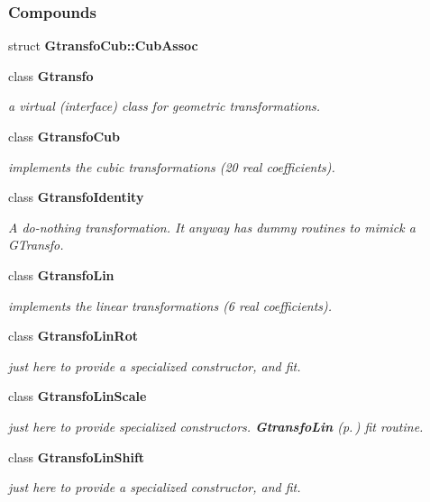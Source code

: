 \subsubsection*{Compounds}
\begin{CompactItemize}
\item 
struct {\bf Gtransfo\-Cub::Cub\-Assoc}
\item 
class {\bf Gtransfo}
\begin{CompactList}\small\item\em a virtual (interface) class for geometric transformations.\item\end{CompactList}\item 
class {\bf Gtransfo\-Cub}
\begin{CompactList}\small\item\em implements the cubic transformations (20 real coefficients).\item\end{CompactList}\item 
class {\bf Gtransfo\-Identity}
\begin{CompactList}\small\item\em A do-nothing transformation. It anyway has dummy routines to mimick a GTransfo.\item\end{CompactList}\item 
class {\bf Gtransfo\-Lin}
\begin{CompactList}\small\item\em implements the linear transformations (6 real coefficients).\item\end{CompactList}\item 
class {\bf Gtransfo\-Lin\-Rot}
\begin{CompactList}\small\item\em just here to provide a specialized constructor, and fit.\item\end{CompactList}\item 
class {\bf Gtransfo\-Lin\-Scale}
\begin{CompactList}\small\item\em just here to provide specialized constructors. {\bf Gtransfo\-Lin} {\rm (p.\,\pageref{class_gtransfolin})} fit routine.\item\end{CompactList}\item 
class {\bf Gtransfo\-Lin\-Shift}
\begin{CompactList}\small\item\em just here to provide a specialized constructor, and fit.\item\end{CompactList}\item 

\end{CompactItemize}
